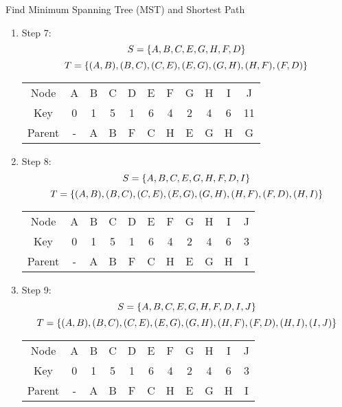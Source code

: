 \documentclass{article}
\numberwithin{table}{section}
\numberwithin{figure}{section}
\begin{document}
\begin{section}{Find Minimum Spanning Tree (MST) and Shortest Path}
\begin{enumerate}[(A)]
\begin{enumerate}[(a)]
\begin{tcolorbox}[breakable]
\begin{enumerate}[(1)]
            \item Step 7:
            $$S = \left\{A, B, C, E, G, H, F, D\right\}$$
            $$T = \left\{(A, B), (B, C), (C, E), (E, G), (G, H), (H, F), (F, D)\right\}$$
            \begin{table}[H]
                \centering
                \begin{tabular}{c|cccccccccc}
                    \hline
                    Node & A & B & C & D & E & F & G & H & I & J \\
                    Key & 0 & 1 & 5 & 1 & 6 & 4 & 2 & 4 & 6 & 11 \\
                    Parent & - & A & B & F & C & H & E & G & H & G \\
                    \hline
                \end{tabular}
            \end{table}
        

            \item Step 8:
            $$S = \left\{A, B, C, E, G, H, F, D, I\right\}$$
            $$T = \left\{(A, B), (B, C), (C, E), (E, G), (G, H), (H, F), (F, D), (H, I)\right\}$$
            \begin{table}[H]
                \centering
                \begin{tabular}{c|cccccccccc}
                    \hline
                    Node & A & B & C & D & E & F & G & H & I & J \\
                    Key & 0 & 1 & 5 & 1 & 6 & 4 & 2 & 4 & 6 & 3 \\
                    Parent & - & A & B & F & C & H & E & G & H & I \\
                    \hline
                \end{tabular}
            \end{table}
        

            \item Step 9:
            $$S = \left\{A, B, C, E, G, H, F, D, I, J\right\}$$
            $$T = \left\{(A, B), (B, C), (C, E), (E, G), (G, H), (H, F), (F, D), (H, I), (I, J)\right\}$$
            \begin{table}[H]
                \centering
                \begin{tabular}{c|cccccccccc}
                    \hline
                    Node & A & B & C & D & E & F & G & H & I & J \\
                    Key & 0 & 1 & 5 & 1 & 6 & 4 & 2 & 4 & 6 & 3 \\
                    Parent & - & A & B & F & C & H & E & G & H & I \\
                    \hline
                \end{tabular}
            \end{table}
        \end{enumerate}
        

\end{tcolorbox}
\end{enumerate}
\end{enumerate}
\end{section}
\end{document}

